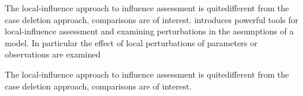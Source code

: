 \documentclass[12pt, a4paper]{report}
\theoremstyle{plain}
\theoremstyle{definition}
\theoremstyle{remark}
\begin{document}
		
		
		The local-influence approach to influence assessment is quitedifferent from the case deletion approach, comparisons are of
		interest.
		\citet{cook86} introduces powerful tools for local-influence assessment and examining perturbations in the assumptions of a model. In particular the effect of local perturbations of parameters or observations are examined	
		
		
		
		The local-influence approach to influence assessment is quitedifferent from the case deletion approach, comparisons are of
		interest.
		
		
		
		
		
		
		
		
		
		
		
		
		
		
		
		
\end{document}
